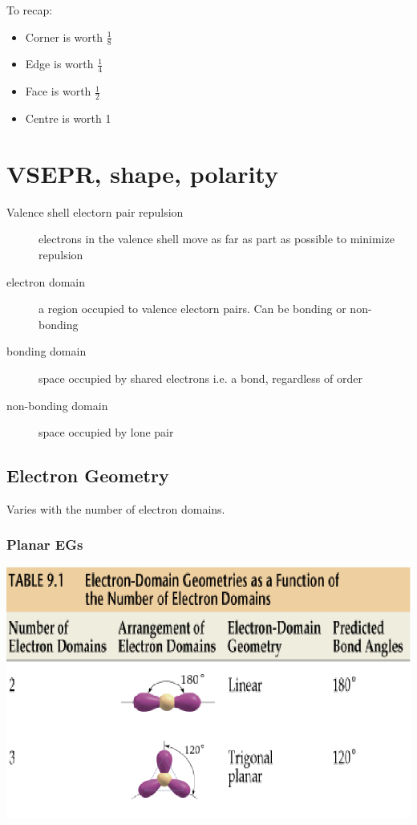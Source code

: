 \documentclass[a4paper, 8pt]{memoir}
\begin{document}
To recap:
\begin{itemize}
\item Corner is worth $\frac{1}{8}$
\item Edge is worth $\frac{1}{4}$
\item Face is worth $\frac{1}{2}$
\item Centre is worth 1
\end{itemize}

\chapter{VSEPR, shape, polarity}
\begin{description}
\item[Valence shell electorn pair repulsion] electrons in the valence shell move as far as part as possible to minimize repulsion
\item[electron domain] a region occupied to valence electorn pairs. Can be bonding or non-bonding
\item[bonding domain] space occupied by shared electrons i.e. a bond, regardless of order
\item[non-bonding domain] space occupied by lone pair
\end{description}
\section{Electron Geometry}
Varies with the number of electron domains.
\subsection {Planar EGs}
\includegraphics[scale=0.4]{planarElectronGeos}
\end{document}
